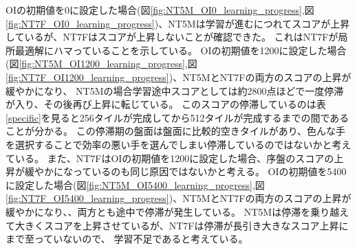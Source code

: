 OIの初期値を0に設定した場合(図\ref{fig:NT5M_OI0_learning_progress},図\ref{fig:NT7F_OI0_learning_progress})、NT5Mは学習が進むにつれてスコアが上昇しているが、NT7Fはスコアが上昇しないことが確認できた。
これはNT7Fが局所最適解にハマっていることを示している。
OIの初期値を1200に設定した場合(図\ref{fig:NT5M_OI1200_learning_progress},図\ref{fig:NT7F_OI1200_learning_progress})、NT5MとNT7Fの両方のスコアの上昇が緩やかになり、
NT5Mの場合学習途中スコアとしては約2800点ほどで一度停滞が入り、その後再び上昇に転じている。
このスコアの停滞しているのは表\ref{specific}を見ると256タイルが完成してから512タイルが完成するまでの間であることが分かる。
この停滞期の盤面は盤面に比較的空きタイルがあり、色んな手を選択することで効率の悪い手を選んでしまい停滞しているのではないかと考えている。
また、NT7FはOIの初期値を1200に設定した場合、序盤のスコアの上昇が緩やかになっているのも同じ原因ではないかと考える。
OIの初期値を5400に設定した場合(図\ref{fig:NT5M_OI5400_learning_progress},図\ref{fig:NT7F_OI5400_learning_progress})、NT5MとNT7Fの両方のスコアの上昇が緩やかになり、、両方とも途中で停滞が発生している。
NT5Mは停滞を乗り越えて大きくスコアを上昇させているが、NT7Fは停滞が長引き大きなスコア上昇にまで至っていないので、
学習不足であると考えている。

